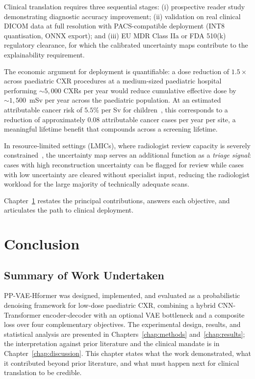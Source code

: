 \documentclass[12pt, a4paper, twoside, openright]{book}
\begin{document}
Clinical translation requires three sequential stages: (i) prospective reader study demonstrating diagnostic accuracy improvement; (ii) validation on real clinical DICOM data at full resolution with PACS-compatible deployment (INT8 quantisation, ONNX export); and (iii) EU MDR Class IIa or FDA 510(k) regulatory clearance, for which the calibrated uncertainty maps contribute to the explainability requirement.

The economic argument for deployment is quantifiable: a dose reduction of $1.5\times$ across paediatric CXR procedures at a medium-sized paediatric hospital performing $\sim5,000$ CXRs per year would reduce cumulative effective dose by $\sim1,500$~mSv per year across the paediatric population. At an estimated attributable cancer risk of $5.5\%$ per Sv for children~\cite{pearce_radiation_2012}, this corresponds to a reduction of approximately $0.08$ attributable cancer cases per year per site, a meaningful lifetime benefit that compounds across a screening lifetime.

In resource-limited settings (LMICs), where radiologist review capacity is severely constrained~\cite{world_health_organisation_classification_2020}, the uncertainty map serves an additional function as a \emph{triage signal}: cases with high reconstruction uncertainty can be flagged for review while cases with low uncertainty are cleared without specialist input, reducing the radiologist workload for the large majority of technically adequate scans.

Chapter~\ref{chap:conclusion} restates the principal contributions, answers each objective, and articulates the path to clinical deployment.

\chapter{Conclusion}
\label{chap:conclusion}

\section{Summary of Work Undertaken}
\label{sec:conc:summary}

PP-VAE-Hformer was designed, implemented, and evaluated as a probabilistic denoising framework for low-dose paediatric CXR, combining a hybrid CNN-Transformer encoder-decoder with an optional VAE bottleneck and a composite loss over four complementary objectives. The experimental design, results, and statistical analysis are presented in Chapters~\ref{chap:methods} and~\ref{chap:results}; the interpretation against prior literature and the clinical mandate is in Chapter~\ref{chap:discussion}. This chapter states what the work demonstrated, what it contributed beyond prior literature, and what must happen next for clinical translation to be credible.
\end{document}
